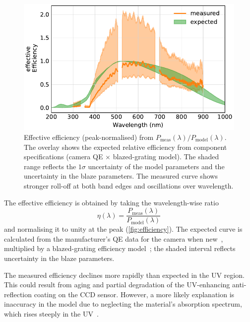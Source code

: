 \documentclass[
	parskip=half,
	a4paper,
]{scrarticle}
\begin{document}
\begin{figure}
    \centering
    \includegraphics{../analysis/figures/efficiency de.pdf}
    \caption{Effective efficiency (peak-normalised) from \(P_{\text{meas}}(\lambda)/P_{\text{model}}(\lambda)\). The overlay shows the expected relative efficiency from component specifications (camera QE \(\times\) blazed-grating model). The shaded range reflects the $1\sigma$ uncertainty of the model parameters and the uncertainty in the blaze parameters. The measured curve shows stronger roll-off at both band edges and oscillations over wavelength.}
    \label{fig:efficiency}
\end{figure}
The effective efficiency is obtained by taking the wavelength-wise ratio
\[
\eta(\lambda) = \frac{P_{\text{meas}}(\lambda)}{P_{\text{model}}(\lambda)}
\]
and normalising it to unity at the peak (\autoref{fig:efficiency}). The expected curve is calculated from the manufacturer’s QE data for the camera when new~\cite{andorIXonEM897Manual}, multiplied by a blazed-grating efficiency model~\cite{barkerRippleCorrectionHighdispersion1984}; the shaded interval reflects uncertainty in the blaze parameters.  

The measured efficiency declines more rapidly than expected in the UV region. This could result from aging and partial degradation of the UV-enhancing anti-reflection coating on the CCD sensor. However, a more likely explanation is inaccuracy in the model due to neglecting the material’s absorption spectrum, which rises steeply in the UV~\cite{smauszDeterminationUVVisible2017}.
\end{document}
